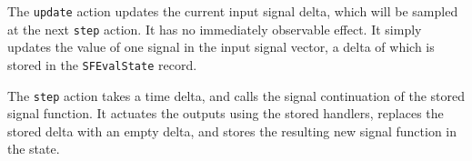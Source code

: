 The {\tt update} action updates the current input signal delta, which will be
sampled at the next {\tt step} action. It has no immediately observable effect.
It simply updates the value of one signal in the input signal vector, a delta
of which is stored in the {\tt SFEvalState} record.

The {\tt step} action takes a time delta, and calls the signal continuation of
the stored signal function. It actuates the outputs using the stored handlers,
replaces the stored delta with an empty delta, and stores the resulting new
signal function in the state.
